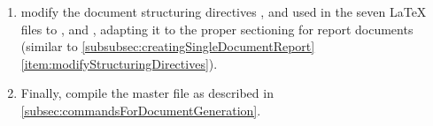 \begin{enumerate}
\item modify the document structuring directives \latexcmd{\section},
  \latexcmd{\subsection} and \latexcmd{\subsubsection} used in the seven
  \LaTeX{} files to \latexcmd{\chapter}, \latexcmd{\section} and
  \latexcmd{\subsection}, adapting it to the proper sectioning for report
  documents (similar to \autoref{subsubsec:creatingSingleDocumentReport}
  \autoref{item:modifyStructuringDirectives}).

\item Finally, compile the master file
   as described
  in \autoref{subsec:commandsForDocumentGeneration}.

\end{enumerate}


